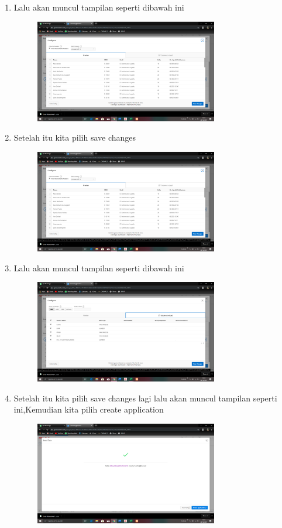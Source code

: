 \documentclass{article}
\begin{document}
\begin{enumerate}
\begin{figure}[h]
    \end{figure}
    \item Lalu akan muncul tampilan seperti dibawah ini
    \begin{figure}[h]
    \centerline{\includegraphics[width=8cm]{image/12.png}}
    \end{figure}
    \newpage\item Setelah itu kita pilih save changes
    \begin{figure}[h]
     \centerline{\includegraphics[width=8cm]{image/13.png}}
    \end{figure}
   \newpage \item Lalu akan muncul tampilan seperti dibawah ini
    \begin{figure}[h]
     \centerline{\includegraphics[width=8cm]{image/14.png}}
    \end{figure}
    \item Setelah itu kita pilih save changes lagi lalu akan muncul tampilan seperti ini,Kemudian kita pilih create application
    \begin{figure}[h]
    \centerline{\includegraphics[width=8cm]{image/15.png}}

\end{figure}
\end{enumerate}
\end{document}
